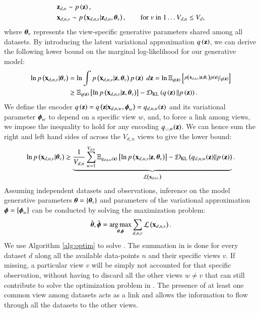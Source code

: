 \begin{equation}\label{eq:model}
\begin{aligned}
&\z_{d,n} \sim \p{\z}, \\  %
&\xdnv \sim \p{\xdnv|\z_{d,n},\thetab_v},  %
\qquad \textnormal {for} \; v \; \textnormal{in} \; 1 \ldots V_{d,n} \leq V_d,
\end{aligned}
\end{equation}
where $\boldsymbol{\theta}_v$ represents the view-specific generative parameters shared among all datasets.
By introducing the latent variational approximation $q\left(\mathbf{z}\right)$, we can derive the following lower bound on the marginal log-likelihood for our generative model:
\begin{equation}\label{eq:LB}
\begin{aligned}
\ln p\left(\mathbf{x}_{d,n,v}|\boldsymbol{\theta}_v\right) &= \ln \int p\left(\mathbf{x}_{d,n,v}|\mathbf{z}, \boldsymbol{\theta}_v\right) p\left(\mathbf{z}\right) \; d\mathbf{z} 
                        = \ln \operatorname{\mathbb{E}}_{q\left(\mathbf{z}\right)}\left[\nicefrac{p\left(\mathbf{x}_{d,n,v}|\mathbf{z}, \boldsymbol{\theta}_v\right) p\left(\mathbf{z}\right)}{q\left(\mathbf{z}\right)}\right] \\
                        &\geq \operatorname{\mathbb{E}}_{q\left(\mathbf{z}\right)}\left[\ln p\left(\mathbf{x}_{d,n,v}|\mathbf{z}, \boldsymbol{\theta}_v\right)\right] - \operatorname{\mathcal{D}_{KL}}\left(q\left(\mathbf{z}\right)||p\left(\mathbf{z}\right)\right). \\
\end{aligned}
\end{equation}
We define the encoder $q\left(\mathbf{z}\right) = q\left(\mathbf{z}|\mathbf{x}_{d,n,w}, \boldsymbol{\phi}_w\right) = q_{d,n,w}(\mathbf{z})$ and its variational parameter $\boldsymbol{\phi}_w$ to depend on a specific view $w$, and, to force a link among views, we impose the inequality  to hold for any encoding $q_{\cdot,\cdot,w}(\mathbf{z})$.
We can hence sum the right and left hand sides of  across the $V_{d,n}$ views to give the lower bound:
\begin{equation}\label{eq:newLB}
\begin{aligned}
\ln p\left(\mathbf{x}_{d,n,v}|\boldsymbol{\theta}_v\right) \geq \underbrace{\frac{1}{V_{d,n}} \sum_{w=1}^{V_{d,n}}
  \operatorname{\mathbb{E}}_{q_{d,n,w}(\mathbf{z})}\left[\ln p\left(\mathbf{x}_{d,n,v}|\mathbf{z}, \boldsymbol{\theta}_v\right)\right]
- \operatorname{\mathcal{D}_{KL}}\left(q_{d,n,w}(\mathbf{z})||p\left(\mathbf{z}\right)\right)}_{\mathcal{L}\left( \mathbf{x}_{d,n,v} \right)}. \\
\end{aligned}
\end{equation}
Assuming independent datasets and observations, inference on the model generative parameters $\boldsymbol{\theta} = \left\{\boldsymbol{\theta}_v\right\}$ and parameters of the variational approximation $\boldsymbol{\phi} = \left\{\boldsymbol{\phi}_w\right\}$ can be conducted by solving the maximization problem:
\begin{equation}\label{eq:argmax}
\begin{aligned}
\hat{\boldsymbol{\theta}}, \hat{\boldsymbol{\phi}} = \underset{\boldsymbol{\theta}, \boldsymbol{\phi}}{\operatorname{arg\,max}} \sum_{d,n,v} \mathcal{L}\left( \mathbf{x}_{d,n,v} \right).
\end{aligned}
\end{equation}
We use Algorithm \ref{alg:optim} to solve .
The summation in  is done for every dataset $d$ along all the available data-points $n$ and their specific views $v$.
If missing, a particular view $v$ will be simply not accounted for that specific observation, without having to discard all the other views $w \neq v$ that can still contribute to solve the optimization problem in .
The presence of at least one common view among datasets acts as a link and allows the information to flow through all the datasets to the other views.

